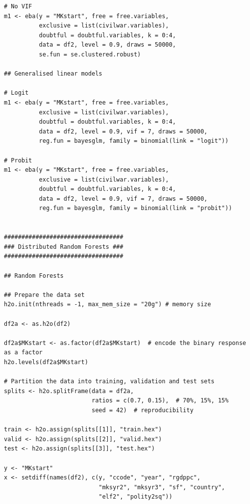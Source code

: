 \begin{verbatim}
# No VIF
m1 <- eba(y = "MKstart", free = free.variables,
          exclusive = list(civilwar.variables),
          doubtful = doubtful.variables, k = 0:4,
          data = df2, level = 0.9, draws = 50000,
          se.fun = se.clustered.robust)

## Generalised linear models

# Logit
m1 <- eba(y = "MKstart", free = free.variables,
          exclusive = list(civilwar.variables),
          doubtful = doubtful.variables, k = 0:4,
          data = df2, level = 0.9, vif = 7, draws = 50000,
          reg.fun = bayesglm, family = binomial(link = "logit"))
          
# Probit
m1 <- eba(y = "MKstart", free = free.variables,
          exclusive = list(civilwar.variables),
          doubtful = doubtful.variables, k = 0:4,
          data = df2, level = 0.9, vif = 7, draws = 50000,
          reg.fun = bayesglm, family = binomial(link = "probit"))
          

##################################
### Distributed Random Forests ###
##################################

## Random Forests

## Prepare the data set
h2o.init(nthreads = -1, max_mem_size = "20g") # memory size

df2a <- as.h2o(df2)

df2a$MKstart <- as.factor(df2a$MKstart)  # encode the binary response as a factor
h2o.levels(df2a$MKstart)

# Partition the data into training, validation and test sets
splits <- h2o.splitFrame(data = df2a, 
                         ratios = c(0.7, 0.15),  # 70%, 15%, 15%
                         seed = 42)  # reproducibility

train <- h2o.assign(splits[[1]], "train.hex")   
valid <- h2o.assign(splits[[2]], "valid.hex") 
test <- h2o.assign(splits[[3]], "test.hex")

y <- "MKstart"
x <- setdiff(names(df2), c(y, "ccode", "year", "rgdppc",
                           "mksyr2", "mksyr3", "sf", "country",
                           "elf2", "polity2sq")) 


\end{verbatim}
